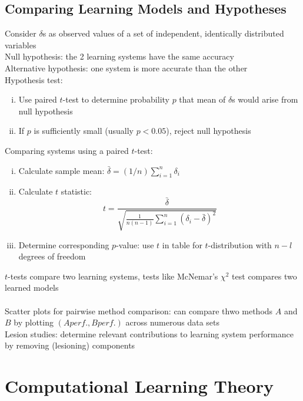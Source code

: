 \documentclass{article}
\begin{document}
		\subsection{Comparing Learning Models and Hypotheses}
			Consider $\delta$s as observed values of a set of independent, identically distributed variables \\
			Null hypothesis: the 2 learning systems have the same accuracy \\
			Alternative hypothesis: one system is more accurate than the other \\
			Hypothesis test:
			\begin{enumerate}[(i)]
				\item Use paired $t$-test to determine probability $p$ that mean of $\delta$s would arise from null hypothesis
				\item If $p$ is sufficiently small (usually $p < 0.05$), reject null hypothesis
				\end{enumerate}
			Comparing systems using a paired $t$-test: 
			\begin{enumerate}[(i)]
				\item Calculate sample mean: $\bar{\delta} = (1/n)\sum_{i = 1}^n \delta_i$
				\item Calculate $t$ statistic:
				\begin{equation*}
					t = \frac{\bar{\delta}}{\sqrt{\frac{1}{n(n - 1)}\sum\limits_{i = 1}^n (\delta_i - \bar{\delta})^2}}
					\end{equation*}
				\item Determine corresponding $p$-value: use $t$ in table for $t$-distribution with $n - l$ degrees of freedom
				\end{enumerate}
			$t$-tests compare two learning systems, tests like McNemar's $\chi^2$ test compares two learned models \\
			\\
			Scatter plots for pairwise method comparison: can compare thwo methods $A$ and $B$ by plotting $(A perf., B perf.)$ across numerous data sets \\
			Lesion studies: determine relevant contributions to learning system performance by removing (lesioning) components
		\clearpage

	\section{Computational Learning Theory}
\end{document}
